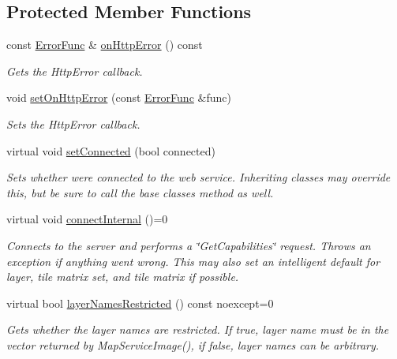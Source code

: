 \subsection*{Protected Member Functions}
\begin{DoxyCompactItemize}
\item 
const \hyperlink{group___utility_module_gaa93ea71a4ed4c044369d3b323aec4435}{Error\+Func} \& \hyperlink{classdg_1_1deepcore_1_1imagery_1_1_map_service_client_aefdf4e99d556396c4e1e3a8f5b81f6de}{on\+Http\+Error} () const 
\begin{DoxyCompactList}\small\item\em Gets the Http\+Error callback. \end{DoxyCompactList}\item 
void \hyperlink{classdg_1_1deepcore_1_1imagery_1_1_map_service_client_a7b4f9d1180013f1f912e744a745eb15b}{set\+On\+Http\+Error} (const \hyperlink{group___utility_module_gaa93ea71a4ed4c044369d3b323aec4435}{Error\+Func} \&func)
\begin{DoxyCompactList}\small\item\em Sets the Http\+Error callback. \end{DoxyCompactList}\item 
virtual void \hyperlink{group___imagery_module_gadf7a167ee936ff1819c8ede7933cc6db}{set\+Connected} (bool connected)
\begin{DoxyCompactList}\small\item\em Sets whether we\textquotesingle{}re connected to the web service. Inheriting classes may override this, but be sure to call the base classe\textquotesingle{}s method as well. \end{DoxyCompactList}\item 
virtual void \hyperlink{group___imagery_module_gabba13ea72115a1196ed44e35cc17f1b9}{connect\+Internal} ()=0
\begin{DoxyCompactList}\small\item\em Connects to the server and performs a \char`\"{}\+Get\+Capabilities\char`\"{} request. Throws an exception if anything went wrong. This may also set an intelligent default for layer, tile matrix set, and tile matrix if possible. \end{DoxyCompactList}\item 
virtual bool \hyperlink{group___imagery_module_ga900665eb2167743cdac5e46ac536c209}{layer\+Names\+Restricted} () const noexcept=0
\begin{DoxyCompactList}\small\item\em Gets whether the layer names are restricted. If true, layer name must be in the vector returned by Map\+Service\+Image(), if false, layer names can be arbitrary. \end{DoxyCompactList}\end{DoxyCompactItemize}


